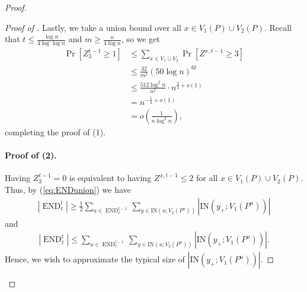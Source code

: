 \documentclass{article}
\DeclareMathOperator{\END}{END}
\newcommand{\IN}[2]{\text{IN}\left(#1; #2 \right)}
\begin{document}
\begin{proof}
\begin{proof}[Proof of ]
		Lastly, we take a union bound over all $x \in V_1(P)\cup V_2(P)$.
		Recall that $t \le \frac{\log n}{4\log\log n}$ and $m \ge \frac{n}{4\log n}$, so we get
		\begin{align*}
		\Pr\left[Z^{t-1}_3 \ge 1 \right] &\le \sum_{x \in V_1\cup V_2} \Pr\left[Z^{x,t-1} \ge 3 \right] \\
		&\le \tfrac{32}{m^2} \left(50\log n \right)^{6t} \\
		&\le \tfrac{512\log^2 n}{n^2} \cdot n^{\frac{3}{4}+o(1)} \\
		&= n^{-\frac{5}{4}+o(1)} \\
		&= o\left(\tfrac{1}{n\log^2 n} \right),
		\end{align*}
		completing the proof of (1).
		
		
		\paragraph*{Proof of (2).}
		Having $Z^{t-1}_3 = 0$ is equivalent to having $Z^{x,t-1} \le 2$ for all $x \in V_1(P) \cup V_2(P)$.
		Thus, by (\ref{eq:ENDunion}) we have
		\begin{align}
		\label{eq:unionlwr}
		\left|\END_{\ell}^t \right| \ge \tfrac{1}{2} \sum_{u \in \END_{\ell}^{t-1}} \sum_{y \in \IN{u}{V_2(P^u)}} \left|\IN{y_+}{V_1(P^u)} \right|
		\end{align}
		and
		\begin{align}
		\label{eq:unionuppr}
		\left|\END_{\ell}^t \right| \le \sum_{u \in \END_{\ell}^{t-1}} \sum_{y \in \IN{u}{V_2(P^u)}} \left|\IN{y_+}{V_1(P^u)} \right|.
		\end{align}
		Hence, we wish to approximate the typical size of $\left|\IN{y_+}{V_1(P^u)} \right|$.
		

\end{proof}
\end{proof}
\end{document}
